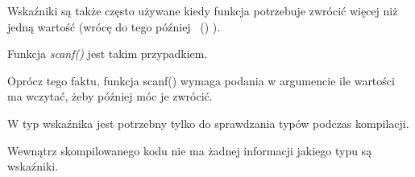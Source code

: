 Wskaźniki są także często używane kiedy funkcja potrzebuje zwrócić więcej niż jedną wartość (wrócę do tego później
~()
).

Funkcja \emph{scanf()} jest takim przypadkiem.

Oprócz tego faktu, funkcja scanf() wymaga podania w argumencie ile wartości ma wczytać, żeby później móc je zwrócić.

W \CCpp typ wskaźnika jest potrzebny tylko do sprawdzania typów podczas kompilacji.

Wewnątrz skompilowanego kodu nie ma żadnej informacji jakiego typu są wskaźniki.





